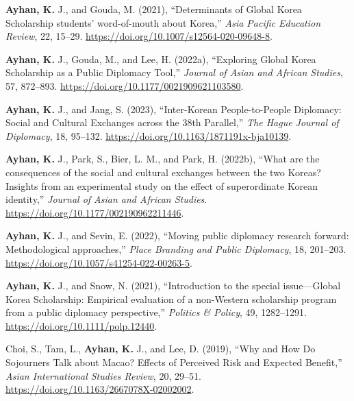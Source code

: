 \documentclass[11pt,a4paper,]{awesome-cv}
\begin{document}
\leavevmode{}%
\textbf{Ayhan, K.} J., and Gouda, M. (2021), {``Determinants of {Global}
{Korea} {Scholarship} students' word-of-mouth about {Korea},''}
\emph{Asia Pacific Education Review}, 22, 15--29.
\url{https://doi.org/10.1007/s12564-020-09648-8}.

\leavevmode{}%
\textbf{Ayhan, K.} J., Gouda, M., and Lee, H. (2022a), {``Exploring
{Global} {Korea} {Scholarship} as a {Public} {Diplomacy} {Tool},''}
\emph{Journal of Asian and African Studies}, 57, 872--893.
\url{https://doi.org/10.1177/0021909621103580}.

\leavevmode{}%
\textbf{Ayhan, K.} J., and Jang, S. (2023), {``Inter-{Korean}
{People}-to-{People} {Diplomacy}: {Social} and {Cultural} {Exchanges}
across the 38th {Parallel},''} \emph{The Hague Journal of Diplomacy},
18, 95--132. \url{https://doi.org/10.1163/1871191x-bja10139}.

\leavevmode{}%
\textbf{Ayhan, K.} J., Park, S., Bier, L. M., and Park, H. (2022b),
{``What are the consequences of the social and cultural exchanges
between the two {Koreas}? {Insights} from an experimental study on the
effect of superordinate {Korean} identity,''} \emph{Journal of Asian and
African Studies}. \url{https://doi.org/10.1177/002190962211446}.

\leavevmode{}%
\textbf{Ayhan, K.} J., and Sevin, E. (2022), {``Moving public diplomacy
research forward: Methodological approaches,''} \emph{Place Branding and
Public Diplomacy}, 18, 201--203.
\url{https://doi.org/10.1057/s41254-022-00263-5}.

\leavevmode{}%
\textbf{Ayhan, K.} J., and Snow, N. (2021), {``Introduction to the
special issue---{Global} {Korea} {Scholarship}: {Empirical} evaluation
of a non-{Western} scholarship program from a public diplomacy
perspective,''} \emph{Politics \& Policy}, 49, 1282--1291.
\url{https://doi.org/10.1111/polp.12440}.

\leavevmode{}%
Choi, S., Tam, L., \textbf{Ayhan, K.} J., and Lee, D. (2019), {``Why and
{How} {Do} {Sojourners} {Talk} about {Macao}? {Effects} of {Perceived}
{Risk} and {Expected} {Benefit},''} \emph{Asian International Studies
Review}, 20, 29--51. \url{https://doi.org/10.1163/2667078X-02002002}.
\end{document}
